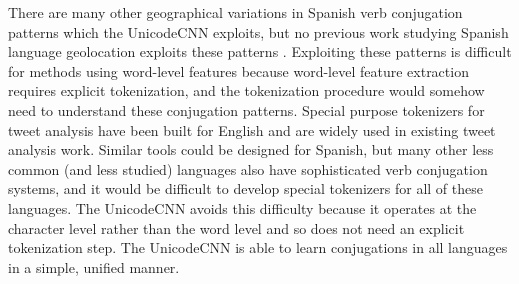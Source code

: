 \documentclass[sigconf,anonymous,review]{acmart}
\newcommand{\str}[1]{\texttt{#1}}
\newcommand{\ignore}[1]{}
\begin{document}
\begin{description}
There are many other geographical variations in Spanish verb conjugation patterns which the UnicodeCNN exploits,
but no previous work studying Spanish language geolocation exploits these patterns 
\citep{maier2014language,gonccalves2015learning,tinoco2017variation,han2014text}. 
Exploiting these patterns is difficult for methods using word-level features because word-level feature extraction requires explicit tokenization,
and the tokenization procedure would somehow need to understand these conjugation patterns.
Special purpose tokenizers for tweet analysis have been built for English \citep{o2010tweetmotif} and are widely used in existing tweet analysis work.
Similar tools could be designed for Spanish,
but many other less common (and less studied) languages also have sophisticated verb conjugation systems,
and it would be difficult to develop special tokenizers for all of these languages.
The UnicodeCNN avoids this difficulty because it operates at the character level rather than the word level and so does not need an explicit tokenization step.
The UnicodeCNN is able to learn conjugations in all languages in a simple, unified manner.

\ignore{
How did our model realize this tweet wasn't from another Spanish speaking country like Mexico or Argentina?
The word \str{pod\'eis} is the most important clue.
\str{pod\'eis} is a conjugation of the verb \str{poder} in the vosotros form,
which is only used in the Castilian Spanish dialect of Spain.
All other Spanish dialects use the ustedes form, 
which would conjugate the verb as \str{pueden}.



We can further refine our guess by using differences in the Spanish dialects spoken in these countries.
In this tweet, the word \str{pod\'eis} is the most important clue.
\str{pod\'eis} is a conjugation of the verb \str{poder} in the vosotros form.
The vosotros form is only used in the Castilian dialect,
which is only used in Spain.
All other Spanish dialects use the ustedes form, 
which would conjugate the verb as \str{pueden}.

}
\end{description}
\end{document}
